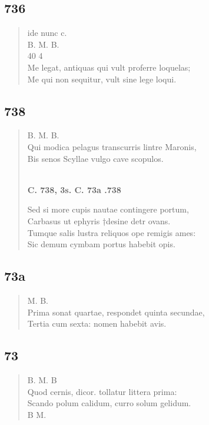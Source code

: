 \documentclass[11pt, a4paper]{report}
\begin{document}
            \subsection*{736}
      \begin{verse}
      ide nunc c. \\ B. M. B. \\ 40 4 \\ Me legat, antiquas qui vult proferre loquelas; \\ Me qui non sequitur, vult sine lege loqui. \\ 
      \end{verse}
  
            \subsection*{738}
      \begin{verse}
      B. M. B. \\ Qui modica pelagus transcurris lintre Maronis, \\ Bis senos Scyllae vulgo cave scopulos. \\ 
        ﻿\pagebreak 
     \marginpar{[220]} \begin{center} \textbf{C. 738, 3s. C. 73a .738} \end{center}Sed si more cupis nautae contingere portum, \\ Carbasus ut ephyris †desine detr ovans. \\ Tumque salis lustra reliquos ope remigis ames: \\ Sic demum cymbam portus habebit opis. \\ 
      \end{verse}
  
            \subsection*{73a}
      \begin{verse}
      M. B. \\ Prima sonat quartae, respondet quinta secundae, \\ Tertia cum sexta: nomen habebit avis. \\ 
      \end{verse}
  
            \subsection*{73}
      \begin{verse}
      B. M. B \\ Quod cernis, dicor. tollatur littera prima: \\ Scando polum calidum, curro solum gelidum. \\ 
        ﻿\pagebreak 
        ﻿\pagebreak 
    B M. \\ 
      \end{verse}
  
\end{document}
